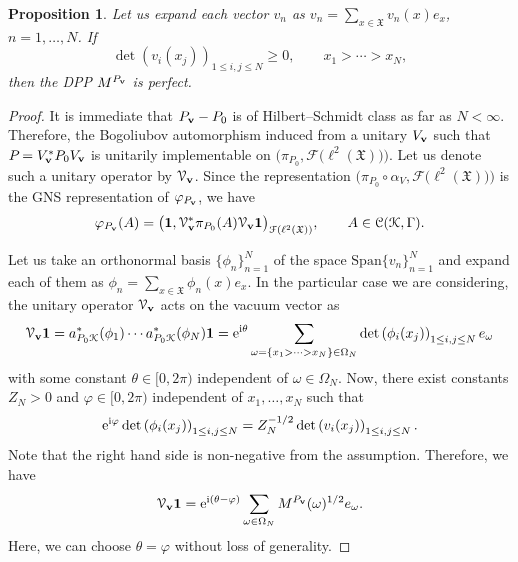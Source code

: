 \documentclass[pdftex]{sigma}
\numberwithin{equation}{section}
\newtheorem{Proposition}[Theorem]{Proposition}
 { \theoremstyle{definition}
\newtheorem{Definition}[Theorem]{Definition}
\newtheorem{Example}[Theorem]{Example}
\newtheorem{Remark}[Theorem]{Remark} }
\newcommand{\mfrak}[1]{\mathfrak{#1}}
\newcommand{\mcal}[1]{\mathcal{#1}}
\newcommand{\mrm}[1]{\mathrm{#1}}
\begin{document}
\begin{Proposition}
\label{prop:perfectness_warmup}
Let us expand each vector $v_{n}$ as $v_{n}=\sum_{x\in\mfrak{X}}v_{n}(x)e_{x}$, $n=1,\dots, N$.
If
\begin{equation*}
	\det (v_{i}(x_{j}) )_{1\le i,j\le N}\ge 0,\qquad x_{1}>\cdots >x_{N},
\end{equation*}
then the DPP $M^{P_{{\bf v}}}$ is perfect.
\end{Proposition}
\begin{proof}
It is immediate that $P_{{\bf v}}-P_{0}$ is of Hilbert--Schmidt class as far as $N<\infty$. Therefore, the Bogoliubov automorphism induced from a unitary $V_{{\bf v}}$ such that $P_{{\bf }}=V_{{\bf v}}^{\ast}P_{0}V_{{\bf v}}$ is unitarily implementable on $\big(\pi_{P_{0}},\mcal{F}\big(\ell^{2}(\mfrak{X})\big)\big)$.
Let us denote such a unitary operator by $\mcal{V}_{{\bf v}}$.
Since the representation $\big(\pi_{P_{0}}\circ \alpha_{V},\mcal{F}\big(\ell^{2}(\mfrak{X})\big)\big)$ is the GNS representation of $\varphi_{P_{{\bf v}}}$, we have
\begin{equation*}
	\varphi_{P_{{\bf v}}}(A)=\big(\bm{1}, \mcal{V}^{\ast}_{{\bf v}}\pi_{P_{0}}(A)\mcal{V}_{{\bf v}}\bm{1}\big)_{\mcal{F}(\ell^{2}(\mfrak{X}))},\qquad A\in \mcal{C}(\mcal{K},\Gamma).
\end{equation*}

Let us take an orthonormal basis $\{\phi_{n}\}_{n=1}^{N}$ of the space $\mrm{Span}\{v_{n}\}_{n=1}^{N}$ and expand each of them as $\phi_{n}=\sum_{x\in\mfrak{X}}\phi_{n}(x)e_{x}$.
In the particular case we are considering, the unitary operator $\mcal{V}_{{\bf v}}$ acts on the vacuum vector as \cite{Ruijsenaars1978}
\begin{equation*}
	\mcal{V}_{{\bf v}}\bm{1}=a_{P_{0}\mcal{K}}^{\ast}(\phi_{1})\cdots a_{P_{0}\mcal{K}}^{\ast}(\phi_{N})\bm{1}={\rm e}^{{\rm i}\theta}\sum_{\omega=\{x_{1}>\cdots >x_{N}\}\in\Omega_{N}}\det \left(\phi_{i}(x_{j})\right)_{1\le i,j\le N}e_{\omega}
\end{equation*}
with some constant $\theta\in [0,2\pi)$ independent of $\omega\in\Omega_{N}$.
Now, there exist constants $Z_{N}> 0$ and $\varphi\in [0,2\pi)$ independent of $x_{1},\dots, x_{N}$ such that
\begin{equation*}
{\rm e}^{{\rm i}\varphi}\det \left(\phi_{i}(x_{j})\right)_{1\le i,j\le N}=Z_{N}^{-1/2}\det \left(v_{i}(x_{j})\right)_{1\le i,j\le N}.
\end{equation*}
Note that the right hand side is non-negative from the assumption. Therefore, we have
\begin{equation}\label{eq:expansion_transformed_vacuum}
	\mcal{V}_{{\bf v}}\bm{1}={\rm e}^{{\rm i}(\theta-\varphi)}\sum_{\omega\in \Omega_{N}} M^{P_{{\bf v}}}(\omega)^{1/2}e_{\omega}.
\end{equation}
Here, we can choose $\theta=\varphi$ without loss of generality.


\end{proof}
\end{document}
